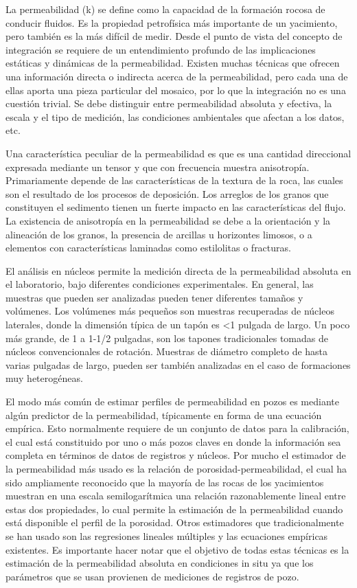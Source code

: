 La permeabilidad (k) se define como la capacidad de la formaci\'on rocosa de conducir fluidos. Es la propiedad petrof\'isica m\'as importante de un yacimiento, pero tambi\'en es la m\'as dif\'icil de medir. Desde el punto de vista del concepto de integraci\'on se requiere de un entendimiento profundo de las implicaciones est\'aticas y din\'amicas de la permeabilidad. Existen muchas t\'ecnicas que ofrecen una informaci\'on directa o indirecta acerca de la permeabilidad, pero cada una de ellas aporta una pieza particular del mosaico, por lo que la integraci\'on no es una cuesti\'on trivial. Se debe distinguir entre permeabilidad absoluta y efectiva, la escala y el tipo de medici\'on, las condiciones ambientales que afectan a los datos, etc.

Una caracter\'istica peculiar de la permeabilidad es que es una cantidad direccional expresada mediante un tensor y que con frecuencia muestra anisotrop\'ia. Primariamente depende de las caracter\'isticas de la textura de la roca, las cuales son el resultado de los procesos de deposici\'on. Los arreglos de los granos que constituyen el sedimento tienen un fuerte impacto en las caracter\'isticas del flujo. La existencia de anisotrop\'ia en la permeabilidad se debe a la orientaci\'on y la alineaci\'on de los granos, la presencia de arcillas u horizontes limosos, o a elementos con caracter\'isticas laminadas como estilolitas o fracturas.

El an\'alisis en n\'ucleos permite la medici\'on directa de la permeabilidad absoluta en el laboratorio, bajo diferentes condiciones experimentales. En general, las muestras que pueden ser analizadas pueden tener diferentes tama\~nos y vol\'umenes. Los vol\'umenes m\'as peque\~nos son muestras recuperadas de n\'ucleos laterales, donde la dimensi\'on t\'ipica de un tap\'on es <1 pulgada de largo. Un poco m\'as grande, de 1 a 1-1/2 pulgadas, son los tapones tradicionales tomadas de n\'ucleos convencionales de rotaci\'on. Muestras de di\'ametro completo de hasta varias pulgadas de largo, pueden ser tambi\'en analizadas en el caso de  formaciones muy heterog\'eneas.

El modo m\'as com\'un de estimar perfiles de permeabilidad en pozos es mediante alg\'un predictor de la permeabilidad, t\'ipicamente en forma de una ecuaci\'on emp\'irica. Esto normalmente requiere de un conjunto de datos para la calibraci\'on, el cual est\'a constituido por uno o m\'as pozos claves en donde la informaci\'on sea completa en t\'erminos de datos de registros y n\'ucleos. Por mucho el estimador de la permeabilidad m\'as usado es la relaci\'on de porosidad-permeabilidad, el cual ha sido ampliamente reconocido que la mayor\'ia de las rocas de los yacimientos muestran en una escala semilogar\'itmica una relaci\'on razonablemente lineal entre estas dos propiedades, lo cual permite la estimaci\'on de la permeabilidad cuando est\'a disponible el perfil de la porosidad. Otros estimadores que tradicionalmente se han usado son las regresiones lineales m\'ultiples y las ecuaciones emp\'iricas existentes. Es importante hacer notar que el objetivo de todas estas t\'ecnicas es la estimaci\'on de la permeabilidad absoluta en condiciones in situ ya que los par\'ametros que se usan provienen de mediciones de registros de pozo.

